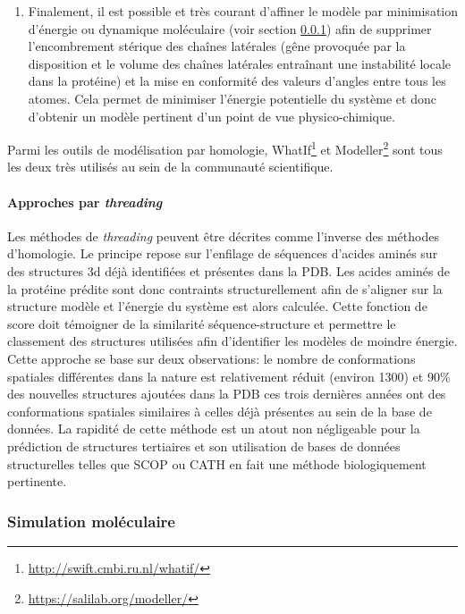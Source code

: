 \begin{enumerate}
	\item Finalement, il est possible et très courant d'affiner le modèle par minimisation d'énergie ou dynamique moléculaire (voir section \ref{simu}) afin de supprimer l'encombrement stérique des chaînes latérales (gêne provoquée par la disposition et le volume des chaînes latérales entraînant une instabilité locale dans la protéine) et la mise en conformité des valeurs d'angles entre tous les atomes. Cela permet de minimiser l'énergie potentielle du système et donc d'obtenir un modèle pertinent d'un point de vue physico-chimique.
\end{enumerate}

Parmi les outils de modélisation par homologie, WhatIf\footnote{\url{http://swift.cmbi.ru.nl/whatif/}} et Modeller\footnote{\url{https://salilab.org/modeller/}} sont tous les deux très utilisés au sein de la communauté scientifique.

\paragraph{Approches par \textit{threading}}

Les méthodes de \textit{threading} peuvent être décrites comme l'inverse des méthodes d'homologie. Le principe repose sur l'enfilage de séquences d'acides aminés sur des structures 3d déjà identifiées et présentes dans la PDB. Les acides aminés de la protéine prédite sont donc contraints structurellement afin de s'aligner sur la structure modèle et l'énergie du système est alors calculée. Cette fonction de score doit témoigner de la similarité séquence-structure et permettre le classement des structures utilisées afin d'identifier les modèles de moindre énergie.
Cette approche se base sur deux observations: le nombre de conformations spatiales différentes dans la nature est relativement réduit (environ 1300) et 90\% des nouvelles structures ajoutées dans la PDB ces trois dernières années ont des conformations spatiales similaires à celles déjà présentes au sein de la base de données.
La rapidité de cette méthode est un atout non négligeable pour la prédiction de structures tertiaires et son utilisation de bases de données structurelles telles que SCOP ou CATH en fait une méthode biologiquement pertinente.

\subsubsection{Simulation moléculaire} \label{simu}

